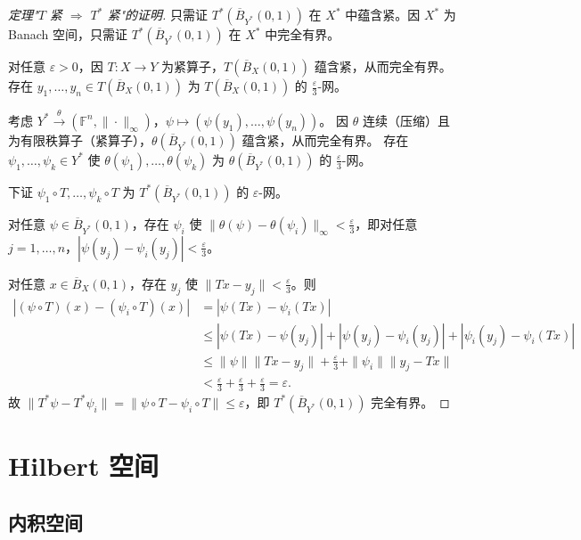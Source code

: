 \documentclass[lang=cn,a4paper,newtx,section]{elegantbook}
\begin{document}
\begin{proof}[定理"$T$ 紧 $\Rightarrow$ $T^*$ 紧"的证明]
  只需证 $T^*(\overline{B}_{Y^*}(0,1))$ 在 $X^*$ 中蕴含紧。因 $X^*$ 为 Banach 空间，只需证 $T^*(\overline{B}_{Y^*}(0,1))$ 在 $X^*$ 中完全有界。

  对任意 $\varepsilon>0$，因 $T:X\to Y$ 为紧算子，$T(\overline{B}_X(0,1))$ 蕴含紧，从而完全有界。
  存在 $y_1,\ldots,y_n\in T(\overline{B}_X(0,1))$ 为 $T(\overline{B}_X(0,1))$ 的 $\frac{\varepsilon}{3}$-网。

  考虑 $Y^*\xrightarrow{\theta}(\mathbb{F}^n,\|\cdot\|_\infty)$，$\psi\mapsto(\psi(y_1),\ldots,\psi(y_n))$。
  因 $\theta$ 连续（压缩）且为有限秩算子（紧算子），$\theta(\overline{B}_{Y^*}(0,1))$ 蕴含紧，从而完全有界。
  存在 $\psi_1,\ldots,\psi_k\in Y^*$ 使 $\theta(\psi_1),\ldots,\theta(\psi_k)$ 为 $\theta(\overline{B}_{Y^*}(0,1))$ 的 $\frac{\varepsilon}{3}$-网。

  下证 $\psi_1\circ T,\ldots,\psi_k\circ T$ 为 $T^*(\overline{B}_{Y^*}(0,1))$ 的 $\varepsilon$-网。

  对任意 $\psi\in\overline{B}_{Y^*}(0,1)$，存在 $\psi_i$ 使 $\|\theta(\psi)-\theta(\psi_i)\|_\infty<\frac{\varepsilon}{3}$，即对任意 $j=1,\ldots,n$，$|\psi(y_j)-\psi_i(y_j)|<\frac{\varepsilon}{3}$。

  对任意 $x\in\overline{B}_X(0,1)$，存在 $y_j$ 使 $\|Tx-y_j\|<\frac{\varepsilon}{3}$。则
  \begin{align*}
    |(\psi\circ T)(x)-(\psi_i\circ T)(x)| &= |\psi(Tx)-\psi_i(Tx)| \\
    &\le |\psi(Tx)-\psi(y_j)|+|\psi(y_j)-\psi_i(y_j)|+|\psi_i(y_j)-\psi_i(Tx)| \\
    &\le \|\psi\|\|Tx-y_j\|+\frac{\varepsilon}{3}+\|\psi_i\|\|y_j-Tx\| \\
    &< \frac{\varepsilon}{3}+\frac{\varepsilon}{3}+\frac{\varepsilon}{3}=\varepsilon.
  \end{align*}
  故 $\|T^*\psi-T^*\psi_i\|=\|\psi\circ T-\psi_i\circ T\|\le\varepsilon$，即 $T^*(\overline{B}_{Y^*}(0,1))$ 完全有界。
\end{proof}

\chapter{Hilbert 空间}

\section{内积空间}
\end{document}
